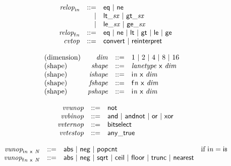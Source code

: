 $$
\begin{array}{@{}lrrl@{}l@{}}
& {{\mathit{relop}}}_{{\mathsf{i}}{{\mathit{n}}}} &::=& \mathsf{eq} ~|~ \mathsf{ne} \\ &&|&
{\mathsf{lt\_}}{{\mathit{sx}}} ~|~ {\mathsf{gt\_}}{{\mathit{sx}}} \\ &&|&
{\mathsf{le\_}}{{\mathit{sx}}} ~|~ {\mathsf{ge\_}}{{\mathit{sx}}} \\
& {{\mathit{relop}}}_{{\mathsf{f}}{{\mathit{n}}}} &::=& \mathsf{eq} ~|~ \mathsf{ne} ~|~ \mathsf{lt} ~|~ \mathsf{gt} ~|~ \mathsf{le} ~|~ \mathsf{ge} \\
& {\mathit{cvtop}} &::=& \mathsf{convert} ~|~ \mathsf{reinterpret} \\
\end{array}
$$

\vspace{1ex}

$$
\begin{array}{@{}lrrl@{}l@{}}
\mbox{(dimension)} & {\mathit{dim}} &::=& 1 ~|~ 2 ~|~ 4 ~|~ 8 ~|~ 16 \\
\mbox{(shape)} & {\mathit{shape}} &::=& {\mathit{lanetype}}~\mathsf{x}~{\mathit{dim}} \\
\mbox{(shape)} & {\mathit{ishape}} &::=& {\mathsf{i}}{{\mathit{n}}}~\mathsf{x}~{\mathit{dim}} \\
\mbox{(shape)} & {\mathit{fshape}} &::=& {\mathsf{f}}{{\mathit{n}}}~\mathsf{x}~{\mathit{dim}} \\
\mbox{(shape)} & {\mathit{pshape}} &::=& {\mathsf{i}}{{\mathit{n}}}~\mathsf{x}~{\mathit{dim}} \\
\end{array}
$$

$$
\begin{array}{@{}lrrl@{}l@{}}
& {\mathit{vvunop}} &::=& \mathsf{not} \\
& {\mathit{vvbinop}} &::=& \mathsf{and} ~|~ \mathsf{andnot} ~|~ \mathsf{or} ~|~ \mathsf{xor} \\
& {\mathit{vvternop}} &::=& \mathsf{bitselect} \\
& {\mathit{vvtestop}} &::=& \mathsf{any\_true} \\
\end{array}
$$

$$
\begin{array}{@{}lrrl@{}l@{}}
& {{\mathit{vunop}}}_{{\mathsf{i}}{{\mathit{n}}}~\mathsf{x}~{\mathit{N}}} &::=& \mathsf{abs} ~|~ \mathsf{neg} ~|~ \mathsf{popcnt} &\quad
  \mbox{if}~{\mathsf{i}}{{\mathit{n}}} = \mathsf{i{\scriptstyle8}} \\
& {{\mathit{vunop}}}_{{\mathsf{f}}{{\mathit{n}}}~\mathsf{x}~{\mathit{N}}} &::=& \mathsf{abs} ~|~ \mathsf{neg} ~|~ \mathsf{sqrt} ~|~ \mathsf{ceil} ~|~ \mathsf{floor} ~|~ \mathsf{trunc} ~|~ \mathsf{nearest} \\
\end{array}
$$

